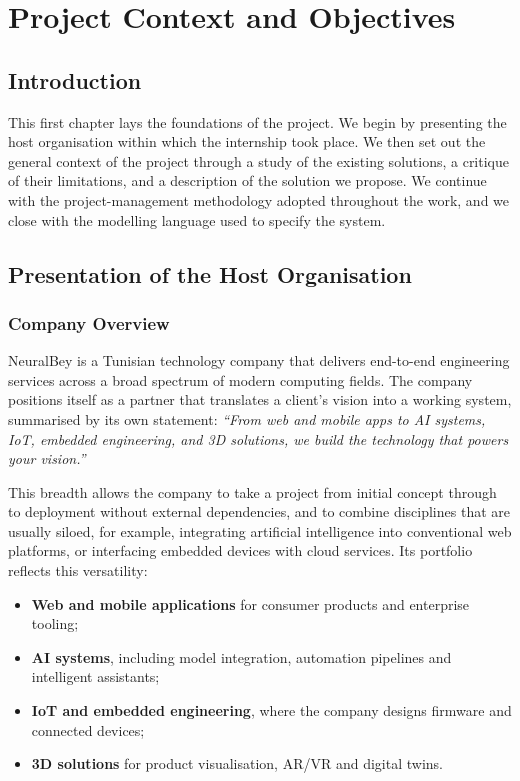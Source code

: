 \chapter{Project Context and Objectives}

\section*{Introduction}

This first chapter lays the foundations of the project. We begin by
presenting the host organisation within which the internship took
place. We then set out the general context of the project through a
study of the existing solutions, a critique of their limitations, and a
description of the solution we propose. We continue with the
project-management methodology adopted throughout the work, and we
close with the modelling language used to specify the system.

\section{Presentation of the Host Organisation}

\subsection{Company Overview}

NeuralBey is a Tunisian technology company that delivers end-to-end
engineering services across a broad spectrum of modern computing
fields. The company positions itself as a partner that translates a
client's vision into a working system, summarised by its own statement:
\textit{``From web and mobile apps to AI systems, IoT, embedded
engineering, and 3D solutions, we build the technology that powers
your vision.''}

This breadth allows the company to take a project from initial concept
through to deployment without external dependencies, and to combine
disciplines that are usually siloed, for example, integrating
artificial intelligence into conventional web platforms, or interfacing
embedded devices with cloud services. Its portfolio reflects this
versatility:

\begin{itemize}[leftmargin=*,itemsep=2pt]
  \item \textbf{Web and mobile applications} for consumer products and
        enterprise tooling;
  \item \textbf{AI systems}, including model integration, automation
        pipelines and intelligent assistants;
  \item \textbf{IoT and embedded engineering}, where the company designs
        firmware and connected devices;
  \item \textbf{3D solutions} for product visualisation, AR/VR and
        digital twins.
\end{itemize}

